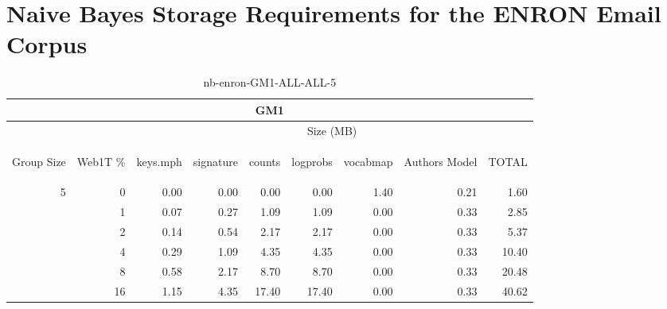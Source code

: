\chapter{Naive Bayes Storage Requirements for the ENRON Email Corpus}

\begin{center}
\begin{table}[htbp]
\begin{tabular}{ | r | r | r | r | r | r | r | r | r |}
\hline
\multicolumn{9}{|c|}{GM1}\\
\hline
 & & \multicolumn{7}{|c|}{Size (MB)}\\ \cline{3-9}
\begin{sideways}Group Size\end{sideways} & \begin{sideways}Web1T \% \end{sideways} & \begin{sideways}keys.mph\end{sideways} & \begin{sideways}signature\end{sideways} & \begin{sideways}counts\end{sideways} & \begin{sideways}logprobs\end{sideways} & \begin{sideways}vocabmap\end{sideways} & \begin{sideways}Authors Model \end{sideways} & \begin{sideways}TOTAL\end{sideways}\\
\hline
\multirow{5}{*}{5}
 & 0 & 0.00 & 0.00 & 0.00 & 0.00 & 1.40 & 0.21 & 1.60\\ \cline{2-9}
 & 1 & 0.07 & 0.27 & 1.09 & 1.09 & 0.00 & 0.33 & 2.85\\ \cline{2-9}
 & 2 & 0.14 & 0.54 & 2.17 & 2.17 & 0.00 & 0.33 & 5.37\\ \cline{2-9}
 & 4 & 0.29 & 1.09 & 4.35 & 4.35 & 0.00 & 0.33 & 10.40\\ \cline{2-9}
 & 8 & 0.58 & 2.17 & 8.70 & 8.70 & 0.00 & 0.33 & 20.48\\ \cline{2-9}
 & 16 & 1.15 & 4.35 & 17.40 & 17.40 & 0.00 & 0.33 & 40.62\\ \cline{2-9}
\hline
\end{tabular}
\caption{nb-enron-GM1-ALL-ALL-5}
\label{table:nb-enron-GM1-ALL-ALL-5}
\end{table}
\end{center}

